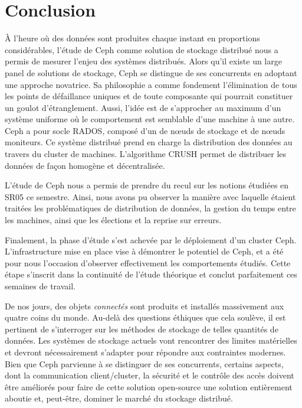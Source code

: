 \chapter{Conclusion}

À l'heure où des données sont produites chaque instant en proportions considérables, l'étude de Ceph comme solution de stockage distribué nous a permis de mesurer l’enjeu des systèmes distribués. Alors qu'il existe un large panel de solutions de stockage, Ceph se distingue de ses concurrents en adoptant une approche novatrice. Sa philosophie a comme fondement l'élimination de tous les points de défaillance uniques et de toute composante qui pourrait constituer un goulot d'étranglement. Aussi, l'idée est de s'approcher au maximum d'un système uniforme où le comportement est semblable d'une machine à une autre. Ceph a pour socle RADOS, composé d'un de nœuds de stockage et de nœuds moniteurs. Ce système distribué prend en charge la distribution des données au travers du cluster de machines. L'algorithme CRUSH permet de distribuer les données de façon homogène et décentralisée.

L'étude de Ceph nous a permis de prendre du recul sur les notions étudiées en SR05 ce semestre. Ainsi, nous avons pu observer la manière avec laquelle étaient traitées les problématiques de distribution de données, la gestion du temps entre les machines, ainsi que les élections et la reprise sur erreurs.

Finalement, la phase d'étude s'est achevée par le déploiement d'un cluster Ceph. L'infrastructure mise en place vise à démontrer le potentiel de Ceph, et a été pour nous l'occasion d'observer effectivement les comportements étudiés. Cette étape s'inscrit dans la continuité de l'étude théorique et conclut parfaitement ces semaines de travail.

De nos jours, des objets \og{}\emph{connectés}\fg{} sont produits et installés massivement aux quatre coins du monde. Au-delà des questions éthiques que cela soulève, il est pertinent de s'interroger sur les méthodes de stockage de telles quantités de données. Les systèmes de stockage actuels vont rencontrer des limites matérielles et devront nécessairement s'adapter pour répondre aux contraintes modernes. Bien que Ceph parvienne à se distinguer de ses concurrents, certains aspects, dont la communication client/cluster, la sécurité et le contrôle des accès doivent être améliorés pour faire de cette solution open-source une solution entièrement aboutie et, peut-être, dominer le marché du stockage distribué.